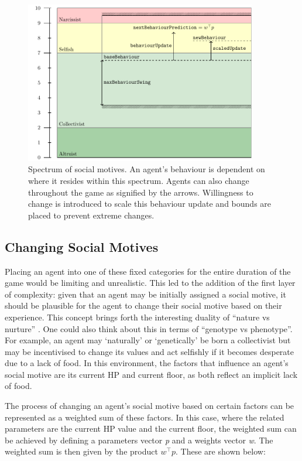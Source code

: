 \begin{figure}[htb]
    \centering
    \includegraphics[width=0.9\textwidth]{008_team_6_agent_design/SOMAS_social_motives.pdf}
    \caption{Spectrum of social motives. An agent's behaviour is dependent on where it resides within this spectrum. Agents can also change throughout the game as signified by the arrows. Willingness to change is introduced to scale this behaviour update and bounds are placed to prevent extreme changes.}
    \label{fig:socialMotives}
\end{figure}


\subsection{Changing Social Motives}
Placing an agent into one of these fixed categories for the entire duration of the game would be limiting and unrealistic. This led to the addition of the first layer of complexity: given that an agent may be initially assigned a social motive, it should be plausible for the agent to change their social motive based on their experience. This concept brings forth the interesting duality of ``nature vs nurture'' \cite{natNur}. One could also think about this in terms of ``genotype vs phenotype''. For example, an agent may `naturally' or `genetically' be born a collectivist but may be incentivised to change its values and act selfishly if it becomes desperate due to a lack of food. In this environment, the factors that influence an agent’s social motive are its current HP and current floor, as both reflect an implicit lack of food.

The process of changing an agent’s social motive based on certain factors can be represented as a weighted sum of these factors. In this case, where the related parameters are the current HP value and the current floor, the weighted sum can be achieved by defining a parameters vector \textit{p} and a weights vector \textit{w}. The weighted sum is then given by the product $w^\top{}p$. These are shown below:


